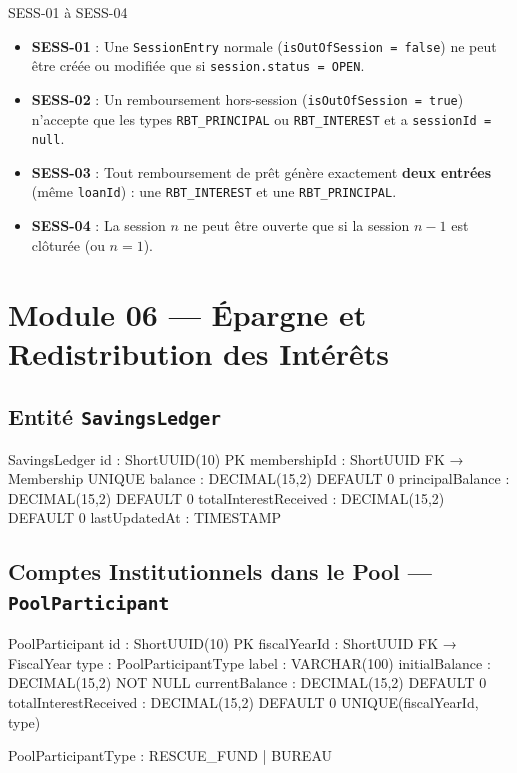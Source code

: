\documentclass[12pt, a4paper]{report}
\begin{document}
\begin{invariantBox}{SESS-01 à SESS-04}
\begin{itemize}
  \item \textbf{SESS-01} : Une \texttt{SessionEntry} normale (\texttt{isOutOfSession = false}) ne peut être créée
        ou modifiée que si \texttt{session.status = OPEN}.
  \item \textbf{SESS-02} : Un remboursement hors-session (\texttt{isOutOfSession = true}) n'accepte que
        les types \texttt{RBT\_PRINCIPAL} ou \texttt{RBT\_INTEREST} et a \texttt{sessionId = null}.
  \item \textbf{SESS-03} : Tout remboursement de prêt génère exactement \textbf{deux entrées} (même \texttt{loanId}) :
        une \texttt{RBT\_INTEREST} et une \texttt{RBT\_PRINCIPAL}.
  \item \textbf{SESS-04} : La session $n$ ne peut être ouverte que si la session $n-1$ est clôturée (ou $n = 1$).
\end{itemize}
\end{invariantBox}

\section{Module 06 — Épargne et Redistribution des Intérêts}

\subsection{Entité \texttt{SavingsLedger}}

\begin{codeBox}
SavingsLedger {
  id                     : ShortUUID(10)  PK
  membershipId           : ShortUUID      FK → Membership  UNIQUE
  balance                : DECIMAL(15,2)  DEFAULT 0
  principalBalance       : DECIMAL(15,2)  DEFAULT 0
  totalInterestReceived  : DECIMAL(15,2)  DEFAULT 0
  lastUpdatedAt          : TIMESTAMP
}
\end{codeBox}

\subsection{Comptes Institutionnels dans le Pool — \texttt{PoolParticipant}}

\begin{codeBox}
PoolParticipant {
  id                     : ShortUUID(10)      PK
  fiscalYearId           : ShortUUID          FK → FiscalYear
  type                   : PoolParticipantType
  label                  : VARCHAR(100)
  initialBalance         : DECIMAL(15,2)      NOT NULL
  currentBalance         : DECIMAL(15,2)      DEFAULT 0
  totalInterestReceived  : DECIMAL(15,2)      DEFAULT 0
  UNIQUE(fiscalYearId, type)
}

PoolParticipantType : RESCUE_FUND | BUREAU
\end{codeBox}
\end{document}
